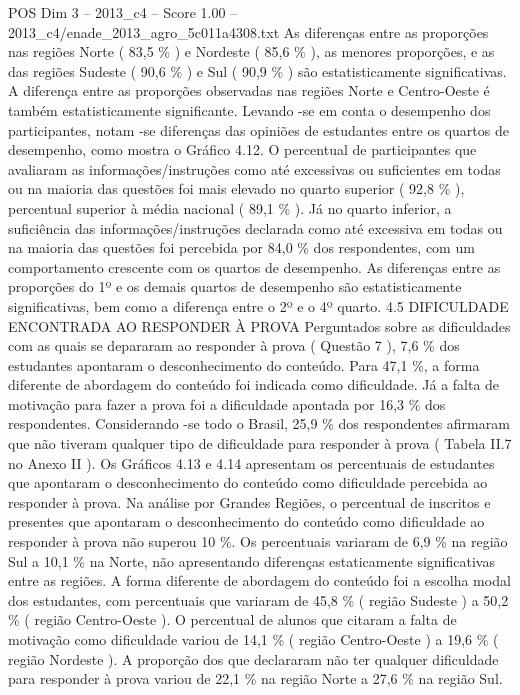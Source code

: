 \begin{textsample}{POS Dim 3 – 2013\_c4 – Score 1.00 – 2013\_c4/enade\_2013\_agro\_5c011a4308.txt}
As diferenças entre as proporções nas regiões Norte ( 83,5 \% ) e Nordeste ( 85,6 \% ), as menores proporções, e as das regiões Sudeste ( 90,6 \% ) e Sul ( 90,9 \% ) são estatisticamente significativas.
A diferença entre as proporções observadas nas regiões Norte e Centro-Oeste é também estatisticamente significante.
Levando -se em conta o desempenho dos participantes, notam -se diferenças das opiniões de estudantes entre os quartos de desempenho, como mostra o Gráfico 4.12.
O percentual de participantes que avaliaram as informações/instruções como até excessivas ou suficientes em todas ou na maioria das questões foi mais elevado no quarto superior ( 92,8 \% ), percentual superior à média nacional ( 89,1 \% ).
Já no quarto inferior, a suficiência das informações/instruções declarada como até excessiva em todas ou na maioria das questões foi percebida por 84,0 \% dos respondentes, com um comportamento crescente com os quartos de desempenho.
As diferenças entre as proporções do 1º e os demais quartos de desempenho são estatisticamente significativas, bem como a diferença entre o 2º e o 4º quarto. 4.5 DIFICULDADE ENCONTRADA AO RESPONDER À PROVA Perguntados sobre as dificuldades com as quais se depararam ao responder à prova ( Questão 7 ), 7,6 \% dos estudantes apontaram o desconhecimento do conteúdo.
Para 47,1 \%, a forma diferente de abordagem do conteúdo foi indicada como dificuldade.
Já a falta de motivação para fazer a prova foi a dificuldade apontada por 16,3 \% dos respondentes.
Considerando -se todo o Brasil, 25,9 \% dos respondentes afirmaram que não tiveram qualquer tipo de dificuldade para responder à prova ( Tabela II.7 no Anexo II ).
Os Gráficos 4.13 e 4.14 apresentam os percentuais de estudantes que apontaram o desconhecimento do conteúdo como dificuldade percebida ao responder à prova.
Na análise por Grandes Regiões, o percentual de inscritos e presentes que apontaram o desconhecimento do conteúdo como dificuldade ao responder à prova não superou 10 \%.
Os percentuais variaram de 6,9 \% na região Sul a 10,1 \% na Norte, não apresentando diferenças estaticamente significativas entre as regiões.
A forma diferente de abordagem do conteúdo foi a escolha modal dos estudantes, com percentuais que variaram de 45,8 \% ( região Sudeste ) a 50,2 \% ( região Centro-Oeste ).
O percentual de alunos que citaram a falta de motivação como dificuldade variou de 14,1 \% ( região Centro-Oeste ) a 19,6 \% ( região Nordeste ).
A proporção dos que declararam não ter qualquer dificuldade para responder à prova variou de 22,1 \% na região Norte a 27,6 \% na região Sul.

\end{textsample}
